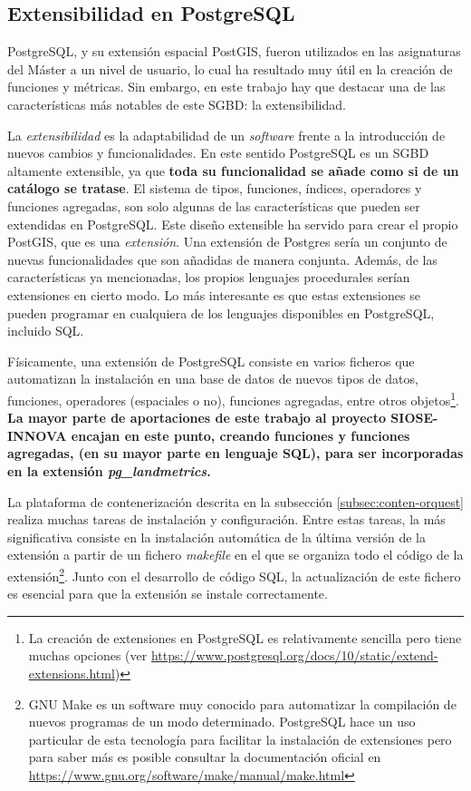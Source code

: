 \subsection{Extensibilidad en PostgreSQL}\label{subsec:exten}

PostgreSQL, y su extensión espacial PostGIS, fueron utilizados en las asignaturas del Máster a un nivel de usuario, lo cual ha resultado muy útil en la creación de funciones y métricas. Sin embargo, en este trabajo hay que destacar una de las características más notables de este SGBD: la extensibilidad.

La \textit{extensibilidad} es la adaptabilidad de un \textit{software} frente a la introducción de nuevos cambios y funcionalidades. En este sentido PostgreSQL es un SGBD altamente extensible, ya que \textbf{toda su funcionalidad se añade como si de un catálogo se tratase}. El sistema de tipos, funciones, índices, operadores y funciones agregadas, son solo algunas de las características que pueden ser extendidas en PostgreSQL. Este diseño extensible ha servido para crear el propio PostGIS, que es una \textit{extensión}. Una extensión de Postgres sería un conjunto de nuevas funcionalidades que son añadidas de manera conjunta. Además, de las características ya mencionadas, los propios lenguajes procedurales serían extensiones en cierto modo. Lo más interesante es que estas extensiones se pueden programar en cualquiera de los lenguajes disponibles en PostgreSQL, incluido SQL.

Físicamente, una extensión de PostgreSQL consiste en varios ficheros que automatizan la instalación en una base de datos de nuevos tipos de datos, funciones, operadores (espaciales o no), funciones agregadas, entre otros objetos\footnote{La creación de extensiones en PostgreSQL es relativamente sencilla pero tiene muchas opciones (ver \href{https://www.postgresql.org/docs/10/static/extend-extensions.html}{https://www.postgresql.org/docs/10/static/extend-extensions.html})}. \textbf{La mayor parte de aportaciones de este trabajo al proyecto SIOSE-INNOVA encajan en este punto, creando funciones y funciones agregadas, (en su mayor parte en lenguaje SQL), para ser incorporadas en la extensión \textit{pg\_landmetrics}.}

La plataforma de contenerización descrita en la subsección \ref{subsec:conten-orquest} realiza muchas tareas de instalación y configuración. Entre estas tareas, la más significativa consiste en la instalación automática de la última versión de la extensión a partir de un fichero \textit{makefile} en el que se organiza todo el código de la extensión\footnote{GNU Make es un software muy conocido para automatizar la compilación de nuevos programas de un modo determinado. PostgreSQL hace un uso particular de esta tecnología para facilitar la instalación de extensiones pero para saber más es posible consultar la documentación oficial en \href{https://www.gnu.org/software/make/manual/make.html}{https://www.gnu.org/software/make/manual/make.html}}. Junto con el desarrollo de código SQL, la actualización de este fichero es esencial para que la extensión se instale correctamente.


